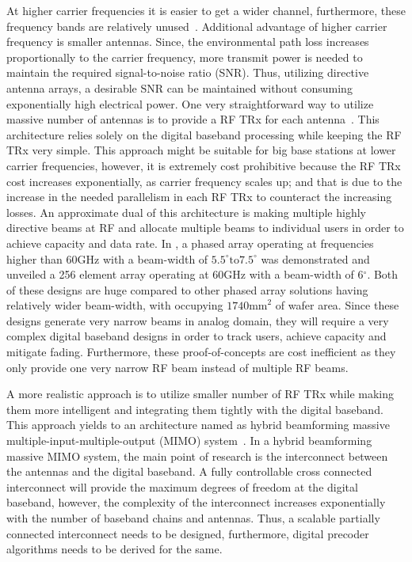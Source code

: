 \documentclass[onecolumn,draftcls,journal]{IEEEtran}
\begin{document}
At higher carrier frequencies it is easier to get a wider channel, furthermore, these frequency bands are relatively unused~\cite{Aziz2015}. Additional advantage of higher carrier frequency is smaller antennas. Since, the environmental path loss increases proportionally to the carrier frequency, more transmit power is needed to maintain the required signal-to-noise ratio (SNR). Thus, utilizing directive antenna arrays, a desirable SNR can be maintained without consuming exponentially high electrical power. One very straightforward way to utilize massive number of antennas is to provide a RF TRx for each antenna~\cite{Vieira2014}.  This architecture relies solely on the digital baseband processing while keeping the RF TRx very simple. This approach might be suitable for big base stations at lower carrier frequencies, however, it is extremely cost prohibitive because the RF TRx cost increases exponentially, as carrier frequency scales up; and that is due to the increase in the needed parallelism in each RF TRx to counteract the increasing losses. An approximate dual of this architecture is making multiple highly directive beams at RF\cite{Rebeiz15p30,Zihir15p2015} and allocate multiple beams to individual users in order to achieve capacity and data rate. In \cite{Rebeiz15p30}, a  phased array operating at frequencies higher than $60\text{GHz}$ with a beam-width of $5.5^{\circ} \text{to} 7.5^{\circ}$ was demonstrated and \cite{Zihir15p2015} unveiled a 256 element array operating at 60GHz with a beam-width of 6$^{\circ}$. Both of these designs are huge compared to other phased array solutions having relatively wider beam-width, with \cite{Zihir15p2015} occupying $\text{1740mm}^2$ of wafer area.
Since these designs generate very narrow beams in analog domain, they will require a very complex digital baseband designs in order to track users, achieve capacity and mitigate fading. Furthermore, these proof-of-concepts are cost inefficient as they only provide one very narrow RF beam instead of multiple RF beams.

 
A more realistic approach is to utilize smaller number of RF TRx while making them more intelligent and integrating them tightly with the digital baseband. This approach yields to an architecture named as hybrid beamforming  massive multiple-input-multiple-output (MIMO) system~\cite{Vook2014}. In a hybrid beamforming massive MIMO system, the main point of research is the interconnect between the antennas and the digital baseband. A fully controllable cross connected interconnect will provide the maximum degrees of freedom at the digital baseband, however, the complexity of the interconnect  increases exponentially with the number of baseband chains and antennas. Thus, a scalable partially connected interconnect needs to be designed, furthermore, digital precoder algorithms needs to be derived for the same.
\end{document}
